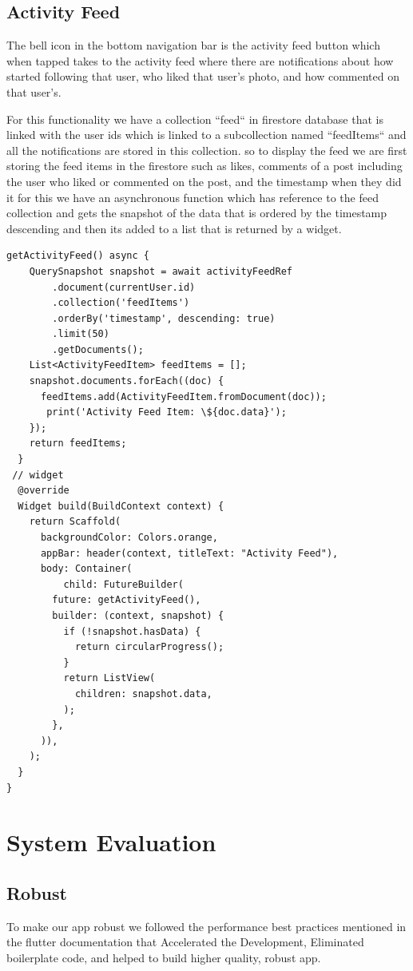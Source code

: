 \section{Activity Feed}
The bell icon in the bottom navigation bar is the activity feed button which when tapped takes to the activity feed where there are notifications about how started following that user, who liked that user's photo, and how commented on that user's.

For this functionality we have a collection ``feed`` in firestore database that is linked with the user ids which is linked to a subcollection named ``feedItems`` and all the notifications are stored in this collection. so to display the feed we are first storing the feed items in the firestore such as likes, comments of a post including the user who liked or commented on the post, and the timestamp when they did it for this we have an asynchronous function which has reference to the feed collection and gets the snapshot of the data that is ordered by the timestamp descending and then its added to a list that is returned by a widget.

\begin{verbatim}
getActivityFeed() async {
    QuerySnapshot snapshot = await activityFeedRef
        .document(currentUser.id)
        .collection('feedItems')
        .orderBy('timestamp', descending: true)
        .limit(50)
        .getDocuments();
    List<ActivityFeedItem> feedItems = [];
    snapshot.documents.forEach((doc) {
      feedItems.add(ActivityFeedItem.fromDocument(doc));
       print('Activity Feed Item: \${doc.data}');
    });
    return feedItems;
  }
 // widget 
  @override
  Widget build(BuildContext context) {
    return Scaffold(
      backgroundColor: Colors.orange,
      appBar: header(context, titleText: "Activity Feed"),
      body: Container(
          child: FutureBuilder(
        future: getActivityFeed(),
        builder: (context, snapshot) {
          if (!snapshot.hasData) {
            return circularProgress();
          }
          return ListView(
            children: snapshot.data,
          );
        },
      )),
    );
  }
}
\end{verbatim}
\chapter{System Evaluation}
\section{Robust}
To make our app robust we followed the performance best practices mentioned in the flutter documentation that Accelerated the Development, Eliminated boilerplate code, and helped to build higher quality, robust app.
